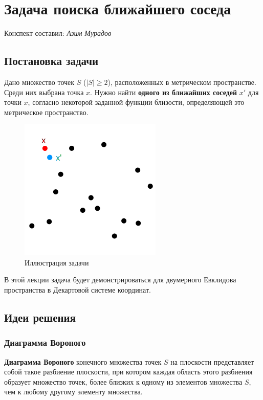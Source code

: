 \section{Задача поиска ближайшего соседа}
\begin{center}
    Конспект составил: \textit{Азим Мурадов}
\end{center}

\subsection{Постановка задачи}

Дано множество точек $S$ ($|S| \geq 2$), расположенных в метрическом пространстве. Среди них выбрана точка $x$.
Нужно найти \textbf{одного из ближайших соседей} $x'$ для точки $x$, согласно некоторой заданной функции близости, определяющей это метрическое пространство.

\begin{figure}[H]
    \centering
    \includegraphics[width=0.6\linewidth]{points.png}
    \caption{Иллюстрация задачи}
\end{figure}

В этой лекции задача будет демонстрироваться для двумерного Евклидова пространства в Декартовой системе координат.

\subsection{Идеи решения}

\subsubsection*{Диаграмма Вороного}

\textbf{Диаграмма Вороного} конечного множества точек $S$ на плоскости представляет собой такое разбиение плоскости, при котором каждая область этого разбиения образует множество точек, более близких к одному из элементов множества $S$, чем к любому другому элементу множества.


